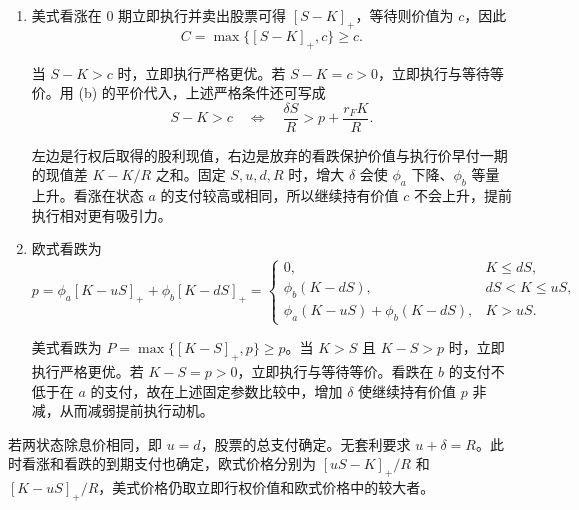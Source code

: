\begin{solution}[blank-type=manual,blank-vsep=9\baselineskip]
\begin{enumerate}[label=(\alph*)]
 \item 美式看涨在 0 期立即执行并卖出股票可得 $[S-K]_+$，等待则价值为 $c$，因此
 \[
 C=\max\{[S-K]_+,c\}\ge c.
 \]

 当 $S-K>c$ 时，立即执行严格更优。若 $S-K=c>0$，立即执行与等待等价。用 (b) 的平价代入，上述严格条件还可写成
 \[
 S-K>c
 \quad\Longleftrightarrow\quad
 \frac{\delta S}{R}>p+\frac{r_F K}{R}.
 \]

 左边是行权后取得的股利现值，右边是放弃的看跌保护价值与执行价早付一期的现值差 $K-K/R$ 之和。固定 $S,u,d,R$ 时，增大 $\delta$ 会使 $\phi_a$ 下降、$\phi_b$ 等量上升。看涨在状态 $a$ 的支付较高或相同，所以继续持有价值 $c$ 不会上升，提前执行相对更有吸引力。

 \item 欧式看跌为
 \[
 p=\phi_a[K-uS]_++\phi_b[K-dS]_+
 =\begin{cases}
 0,&K\le dS,\\
 \phi_b(K-dS),&dS<K\le uS,\\
 \phi_a(K-uS)+\phi_b(K-dS),&K>uS.
 \end{cases}
 \]

 美式看跌为 $P=\max\{[K-S]_+,p\}\ge p$。当 $K>S$ 且 $K-S>p$ 时，立即执行严格更优。若 $K-S=p>0$，立即执行与等待等价。看跌在 $b$ 的支付不低于在 $a$ 的支付，故在上述固定参数比较中，增加 $\delta$ 使继续持有价值 $p$ 非减，从而减弱提前执行动机。
\end{enumerate}

若两状态除息价相同，即 $u=d$，股票的总支付确定。无套利要求 $u+\delta=R$。此时看涨和看跌的到期支付也确定，欧式价格分别为 $[uS-K]_+/R$ 和 $[K-uS]_+/R$，美式价格仍取立即行权价值和欧式价格中的较大者。
\end{solution}


